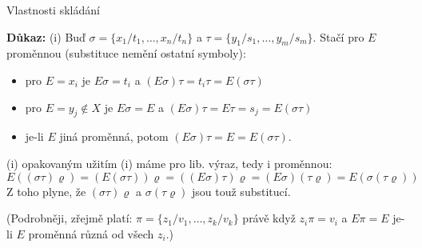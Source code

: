 \documentclass{beamer}
\begin{document}
\begin{frame}{Vlastnosti skládání}


    \medskip

    \textbf{Důkaz:} \alert{(i)} Buď $\sigma=\{x_1/t_1,\dots,x_n/t_n\}$ a $\tau=\{y_1/s_1,\dots,y_m/s_m\}$. Stačí pro $E$ proměnnou (substituce nemění ostatní symboly):\pause
    \begin{itemize}
        \item pro $E=x_i$ je $E\sigma=t_i$ a $(E\sigma)\tau=t_i\tau=E(\sigma\tau)$\pause
        \item pro $E=y_j\notin X$ je $E\sigma=E$ a $(E\sigma)\tau=E\tau=s_j=E(\sigma\tau)$\pause
        \item je-li $E$ jiná proměnná, potom $(E\sigma)\tau=E=E(\sigma\tau)$.\pause
    \end{itemize}
    \alert{(i)} opakovaným užitím (i) máme pro lib. výraz, tedy i proměnnou:\pause
    $$
    E((\sigma\tau)\varrho)=(E(\sigma\tau))\varrho=((E\sigma)\tau)\varrho=(E\sigma)(\tau\varrho)=E(\sigma(\tau\varrho))
    $$\pause
    Z toho plyne, že $(\sigma\tau)\varrho$ a $\sigma(\tau\varrho)$ jsou touž substitucí. \pause
    
    (Podrobněji, zřejmě platí: $\pi=\{z_1/v_1,\dots,z_k/v_k\}$ právě když $z_i\pi=v_i$ a $E\pi=E$ je-li $E$ proměnná různá od všech $z_i$.) \hfill\qedsymbol

\end{frame}
\end{document}
